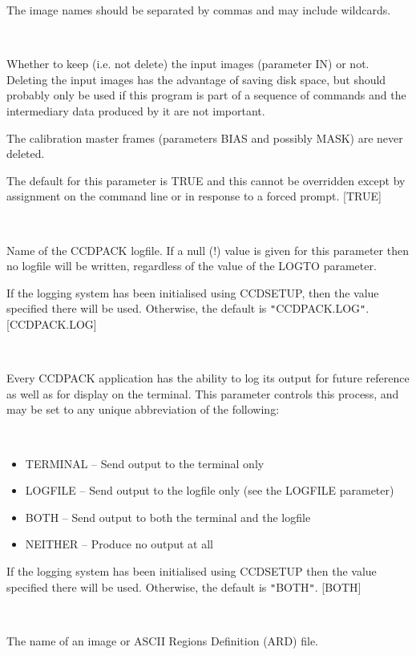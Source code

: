\documentclass[twoside,11pt]{article}
\newcommand{\htmlref}[2]{#1}
\renewcommand{\_}{\texttt{\symbol{95}}}
\newcommand{\qt}[1]{{\tt "}#1{\tt "}}
\newcommand{\xroutine}[1]{\htmlref{{\sc #1}}{#1}}
\newcommand{\sstsubsection}[1]{ \item[{#1}] \mbox{} \\}
\newcommand{\sstitemlist}[1]{
  \mbox{} \\
  \vspace{-3.5ex}
  \begin{itemize}
     #1
  \end{itemize}
}
\newcommand{\sstitem}{\item}
\newcommand{\sstsubsection}[1]{\item[{#1}]}
\newcommand{\sstitemlist}[1]{
      \begin{itemize}
         #1
      \end{itemize}
      \\
   }
\newcommand{\sstitem}{\item}
\begin{document}
{{{         The image names should be separated by commas and may include
         wildcards.
      }
      \sstsubsection{
         KEEPIN = \_LOGICAL (Read)
      } {
         Whether to keep (i.e. not delete) the input images (parameter IN)
         or not. Deleting the input images has the advantage of saving
         disk space, but should probably only be used if this program
         is part of a sequence of commands and the intermediary data
         produced by it are not important.

         The calibration master frames (parameters BIAS and possibly MASK)
         are never deleted.

         The default for this parameter is TRUE and this cannot be
         overridden except by assignment on the command line or in
         response to a forced prompt.
         [TRUE]
      }
      \sstsubsection{
         LOGFILE = FILENAME (Read)
      } {
         Name of the CCDPACK logfile.  If a null (!) value is given for
         this parameter then no logfile will be written, regardless of
         the value of the LOGTO parameter.

         If the logging system has been initialised using \xroutine{CCDSETUP},
         then the value specified there will be used. Otherwise, the
         default is \qt{CCDPACK.LOG}.
         [CCDPACK.LOG]
      }
      \sstsubsection{
         LOGTO = LITERAL (Read)
      } {
         Every CCDPACK application has the ability to log its output
         for future reference as well as for display on the terminal.
         This parameter controls this process, and may be set to any
         unique abbreviation of the following:
         \sstitemlist{

            \sstitem
               TERMINAL  -- Send output to the terminal only

            \sstitem
               LOGFILE   -- Send output to the logfile only (see the
                               LOGFILE parameter)

            \sstitem
               BOTH      -- Send output to both the terminal and the
                               logfile

            \sstitem
               NEITHER   -- Produce no output at all

         }
         If the logging system has been initialised using \xroutine{CCDSETUP}
         then the value specified there will be used. Otherwise, the
         default is \qt{BOTH}.
         [BOTH]
      }
      \sstsubsection{
         MASK = LITERAL (Read)
      } {
         The name of an image or ASCII Regions Definition (ARD) file.

}}}
\end{document}
